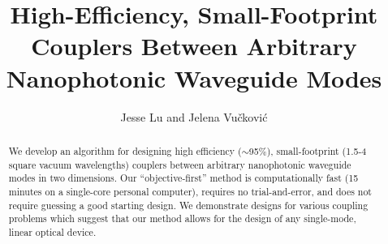 \documentclass[letterpaper,10pt]{article}
\begin{document}
\title{High-Efficiency, Small-Footprint Couplers Between 
    Arbitrary Nanophotonic Waveguide Modes}
\author{Jesse Lu and Jelena Vu\v{c}kovi\'{c}}
\address{Stanford University, Stanford, California, USA.}

\maketitle
\begin{abstract}
We develop an algorithm for designing
    high efficiency ($\sim$95\%), 
    small-footprint (1.5-4 square vacuum wavelengths)
    couplers between arbitrary nanophotonic waveguide modes
    in two dimensions.
Our ``objective-first'' method is
    computationally fast (15 minutes on a single-core personal computer), 
    requires no trial-and-error, and
    does not require guessing a good starting design.
We demonstrate designs for various coupling problems which suggest 
    that our method allows for the design of any 
    single-mode, linear optical device.
\end{abstract}
\end{document}
